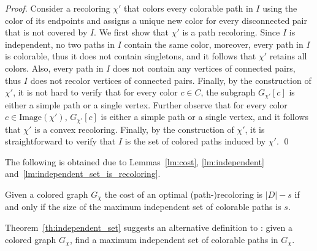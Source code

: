 \begin{proof}
Consider a recoloring $\chi'$ that colors every colorable path in $I$
using the color of its endpoints and assigns a unique new color for
every disconnected pair that is not covered by $I$.
%
We first show that $\chi'$ is a path recoloring.  
%
Since $I$ is independent, 
no two paths in $I$ contain the same color, moreover,
every path in $I$ is colorable, 
thus it does not contain singletons, 
and it follows that $\chi'$ retains all colors.  
%
Also, every path in $I$ does not contain any vertices of connected pairs, 
thus $I$ does not recolor vertices of connected pairs.
%
Finally, by the construction of $\chi'$, 
it is not hard to verify that for every color $c \in C$,
the subgraph $G_{\chi'}[c]$ is either a simple path or a single vertex.
%
Further observe that for every color $c \in \text{Image}(\chi')$,
$G_{\chi'}[c]$ is either a simple path or a single vertex, and it
follows that $\chi'$ is a convex recoloring.  
%
Finally, by the
construction of $\chi'$, it is straightforward to verify that $I$ is
the set of colored paths induced by $\chi'$.
\qed{}\end{proof}

The following is obtained due to  Lemmas~\ref{lm:cost}, 
\ref{lm:independent} and~\ref{lm:independent_set_is_recoloring}.

\begin{theorem}
\label{th:independent_set}
Given a colored graph $G_\chi$ the cost of an optimal
(path-)recoloring is $|D| - s$ if and only if the size of the maximum
independent set of colorable paths is $s$.
\end{theorem}

Theorem~\ref{th:independent_set} suggests an alternative definition to \TWOCR{}: 
given a colored graph $G_\chi$, 
find a maximum independent set of colorable paths in $G_\chi$.
